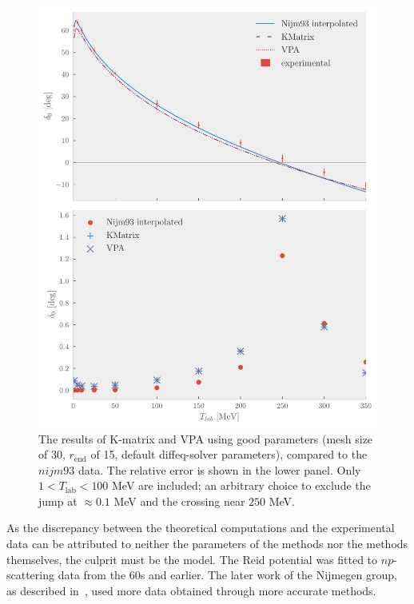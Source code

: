 \begin{figure}[ht!]
  \centering
  \includegraphics[]{Figures/vpa_kmatrix_compare.pdf}
  \caption{\label{fig:vpa_matrix_compare}The results of K-matrix and VPA using
    good parameters (mesh size of 30, \(r_{\text{end}}\) of 15, default
    diffeq-solver parameters), compared to the \(nijm93\) data. The relative error is
    shown in the lower panel. Only \mbox{\(1 < T_{\mathrm{lab}} < 100\)} MeV are
    included; an arbitrary choice to exclude the jump at \(\approx 0.1 \) MeV
    and the crossing near \(250\) MeV.}
\end{figure}

As the
discrepancy between the theoretical computations and the experimental data can
be attributed to neither the parameters of the methods nor the methods
themselves, the culprit must be the model. The Reid potential was fitted to
\(np\)-scattering data from the \(60\)s and earlier. The later work of the
Nijmegen group, as described in~\cite{PhysRevC.48.792}, used more data obtained
through more accurate methods.

